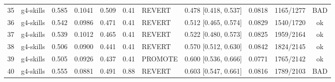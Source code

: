 \begin{tabular}{llcccclccc c}
35 & g4-skills & 0.585 & 0.1041 & 0.509 & 0.41 & REVERT & 0.478 [0.418, 0.537] & 0.0818 & 1165/1277 & BAD \\
36 & g4-skills & 0.542 & 0.0986 & 0.471 & 0.41 & REVERT & 0.512 [0.465, 0.574] & 0.0829 & 1540/1720 & ok \\
37 & g4-skills & 0.539 & 0.1012 & 0.465 & 0.41 & REVERT & 0.522 [0.480, 0.573] & 0.0825 & 1959/2164 & ok \\
38 & g4-skills & 0.506 & 0.0900 & 0.441 & 0.41 & REVERT & 0.570 [0.512, 0.630] & 0.0842 & 1824/2145 & ok \\
39 & g4-skills & 0.505 & 0.0926 & 0.437 & 0.41 & PROMOTE & 0.600 [0.536, 0.666] & 0.0771 & 1765/2142 & ok \\
40 & g4-skills & 0.555 & 0.0881 & 0.491 & 0.88 & REVERT & 0.603 [0.547, 0.661] & 0.0816 & 1789/2103 & BAD \\
\bottomrule
\end{tabular}
